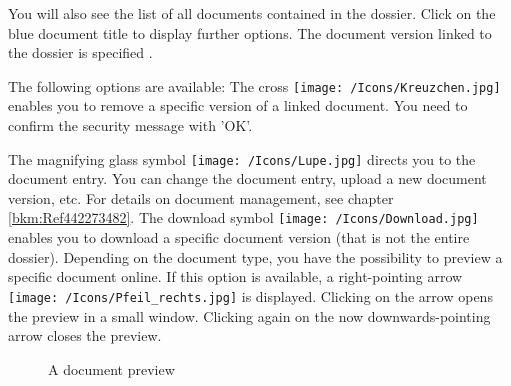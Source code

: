 You will also see the list of all documents contained in the dossier. Click on the blue document title  to display further options. The document version linked to the dossier is specified . \newline

The following options are available:
The cross \texttt{[image: /Icons/Kreuzchen.jpg]}  enables you to remove a specific version of a linked document. You need to confirm the security message with 'OK'.

\begin{figure}[H]
\end{figure}

The magnifying glass symbol \texttt{[image: /Icons/Lupe.jpg]}  directs you to the document entry. You can change the document entry, upload a new document version, etc. For details on document management, see chapter \ref{bkm:Ref442273482}. The download symbol \texttt{[image: /Icons/Download.jpg]}  enables you to download a specific document version (that is not the entire dossier). Depending on the document type, you have the possibility to preview a specific document online. If this option is available, a right-pointing arrow \texttt{[image: /Icons/Pfeil\_rechts.jpg]}  is displayed. Clicking on the arrow opens the preview in a small window. Clicking again on the now downwards-pointing arrow closes the preview.

\begin{figure}[H]
\caption{A document preview}
\end{figure}

